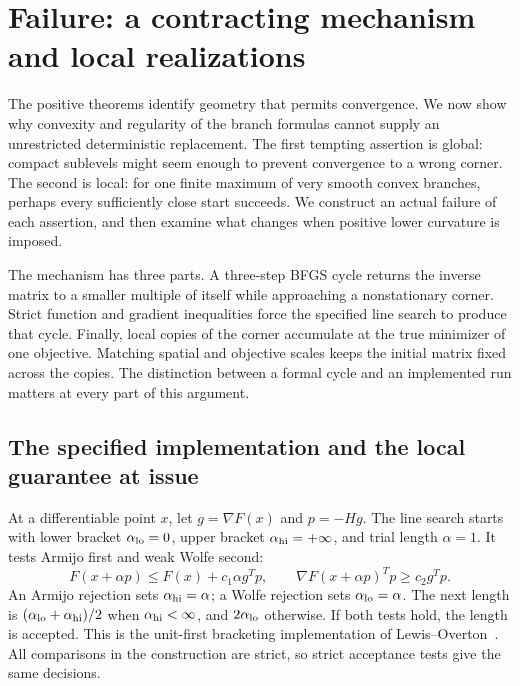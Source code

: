 \section{Failure: a contracting mechanism and local realizations}
\label{art:failure}

The positive theorems identify geometry that permits convergence. We now show
why convexity and regularity of the branch formulas cannot supply an
unrestricted deterministic replacement. The first tempting assertion is
global: compact sublevels might seem enough to prevent convergence to a wrong
corner. The second is local: for one finite maximum of very smooth convex
branches, perhaps every sufficiently close start succeeds. We construct an
actual failure of each assertion, and then examine what changes when positive
lower curvature is imposed.

The mechanism has three parts. A three-step BFGS cycle returns the inverse
matrix to a smaller multiple of itself while approaching a nonstationary
corner. Strict function and gradient inequalities force the specified line
search to produce that cycle. Finally, local copies of the corner accumulate
at the true minimizer of one objective. Matching spatial and objective scales
keeps the initial matrix fixed across the copies. The distinction between a
formal cycle and an implemented run matters at every part of this argument.

\subsection{The specified implementation and the local guarantee at issue}
At a differentiable point $x$, let $g=\nabla F(x)$ and $p=-Hg$.
The line search starts with lower bracket $\alpha_{\rm lo}=0$, upper bracket
$\alpha_{\rm hi}=+\infty$, and trial length $\alpha=1$. It tests Armijo first and weak
Wolfe second:
\begin{equation}\label{art:failure_tests}
 F(x+\alpha p)\le F(x)+c_1\alpha g^Tp,
 \qquad \nabla F(x+\alpha p)^Tp\ge c_2g^Tp.
\end{equation}
An Armijo rejection sets $\alpha_{\rm hi}=\alpha$; a Wolfe rejection sets $\alpha_{\rm lo}=\alpha$.
The next length is $(\alpha_{\rm lo}+\alpha_{\rm hi})/2$ when $\alpha_{\rm hi}<\infty$, and $2\alpha_{\rm lo}$ otherwise.
If both tests hold, the length is accepted. This is the unit-first
bracketing implementation of Lewis--Overton~\cite[Algorithm~4.6]{LO}.
All comparisons in the construction are strict, so strict acceptance tests
give the same decisions.

